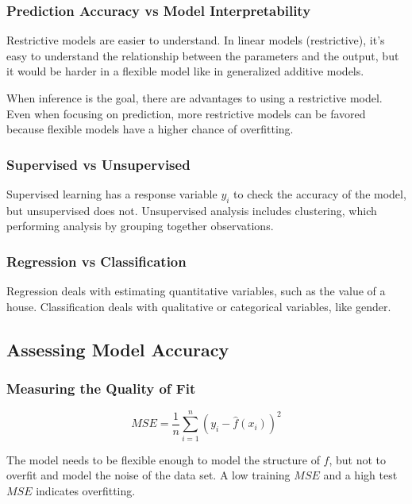 \documentclass[
]{article}
\begin{document}
\hypertarget{header-n25}{%
\subsubsection{Prediction Accuracy vs Model
Interpretability}\label{header-n25}}

Restrictive models are easier to understand. In linear models
(restrictive), it's easy to understand the relationship between the
parameters and the output, but it would be harder in a flexible model
like in generalized additive models.

When inference is the goal, there are advantages to using a restrictive
model. Even when focusing on prediction, more restrictive models can be
favored because flexible models have a higher chance of overfitting.

\hypertarget{header-n28}{%
\subsubsection{Supervised vs Unsupervised}\label{header-n28}}

Supervised learning has a response variable \(y_i\) to check the
accuracy of the model, but unsupervised does not. Unsupervised analysis
includes clustering, which performing analysis by grouping together
observations.

\hypertarget{header-n30}{%
\subsubsection{Regression vs Classification}\label{header-n30}}

Regression deals with estimating quantitative variables, such as the
value of a house. Classification deals with qualitative or categorical
variables, like gender.

\hypertarget{header-n32}{%
\subsection{Assessing Model Accuracy}\label{header-n32}}

\hypertarget{header-n33}{%
\subsubsection{Measuring the Quality of Fit}\label{header-n33}}

\[MSE = \frac{1}{n}\sum^n_{i=1}(y_i - \hat{f}(x_i))^2\]

The model needs to be flexible enough to model the structure of \(f\),
but not to overfit and model the noise of the data set. A low training
\(MSE\) and a high test \(MSE\) indicates overfitting.
\end{document}
